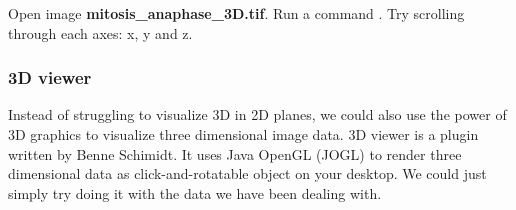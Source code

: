 \begin{indentexercise}{2}
Open image \textbf{mitosis\_anaphase\_3D.tif}.
Run a command . Try scrolling through each axes: x, y and z. 
\end{indentexercise}

\subsubsection{3D viewer}

Instead of struggling to visualize 3D in 2D planes, we could also use the power of 3D graphics to visualize three dimensional image data. 3D viewer is a plugin written by Benne Schimidt. It uses Java OpenGL (JOGL) to render three dimensional data as click-and-rotatable object on your desktop. We could just simply try doing it with the data we have been dealing with. 

